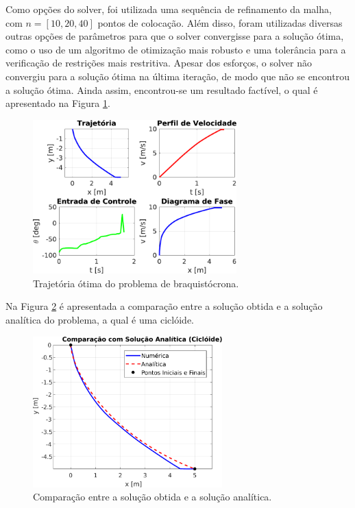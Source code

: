 Como opções do solver, foi utilizada uma sequência de refinamento da malha, com $n=[10, 20, 40]$ pontos de colocação. Além disso, foram utilizadas diversas outras opções de parâmetros para que o solver convergisse para a solução ótima, como o uso de um algoritmo de otimização mais robusto e uma tolerância para a verificação de restrições mais restritiva. Apesar dos esforços, o solver não convergiu para a solução ótima na última iteração, de modo que não se encontrou a solução ótima. Ainda assim, encontrou-se um resultado factível, o qual é apresentado na Figura \ref{fig:resultados-braquistocrona}.

\begin{figure}[H]
    \centering
    \includegraphics[width=0.7\textwidth]{Cap4/figuras/braquistocrona.pdf}
    \caption{Trajetória ótima do problema de braquistócrona.}
    \label{fig:resultados-braquistocrona}
\end{figure}

Na Figura \ref{fig:resultados-braquistocrona-comparacao} é apresentada a comparação entre a solução obtida e a solução analítica do problema, a qual é uma ciclóide.

\begin{figure}[H]
    \centering
    \includegraphics[width=0.65\textwidth]{Cap4/figuras/braquistocrona-comparacao.pdf}
    \caption{Comparação entre a solução obtida e a solução analítica.}
    \label{fig:resultados-braquistocrona-comparacao}
\end{figure}



